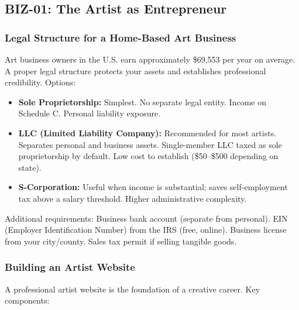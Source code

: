 \documentclass[11pt,letterpaper]{article}
\begin{document}
\subsection{BIZ-01: The Artist as Entrepreneur}

\subsubsection{Legal Structure for a Home-Based Art Business}

Art business owners in the U.S. earn approximately \$69,553 per year on average. A proper legal structure protects your assets and establishes professional credibility. Options:

\begin{itemize}[noitemsep]
  \item \textbf{Sole Proprietorship:} Simplest. No separate legal entity. Income on Schedule C. Personal liability exposure.
  \item \textbf{LLC (Limited Liability Company):} Recommended for most artists. Separates personal and business assets. Single-member LLC taxed as sole proprietorship by default. Low cost to establish (\$50--\$500 depending on state).
  \item \textbf{S-Corporation:} Useful when income is substantial; saves self-employment tax above a salary threshold. Higher administrative complexity.
\end{itemize}

Additional requirements: Business bank account (separate from personal). EIN (Employer Identification Number) from the IRS (free, online). Business license from your city/county. Sales tax permit if selling tangible goods.

\subsubsection{Building an Artist Website}

A professional artist website is the foundation of a creative career. Key components:
\end{document}
